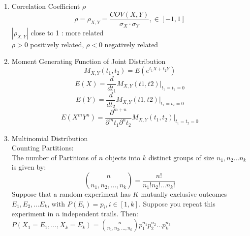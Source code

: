 \documentclass[10pt]{article}
\begin{document}
\begin{multicols}{2}
\begin{enumerate}
\begin{enumerate}
				\item Correlation Coefficient $\rho$\\
				$$\rho = \rho_{X,Y}= \frac{COV(X,Y)}{\sigma_X \cdot \sigma_Y}, \in [-1,1]$$
				$|\rho_{X,Y}|$ close to 1 : more related\\
				$\rho > 0$ positively related, $\rho < 0$ negatively related
				\item Moment Generating Function of Joint Distribution
				$$M_{X,Y}(t_1, t_2) = E(e^{t_1X + t_2Y})$$
				$$E(X)=\frac{d}{dt_1}M_{X,Y}(t1,t2)|_{t_1=t_2=0}$$
				$$E(Y) = \frac{d}{dt_2}M_{X,Y}(t1,t2)|_{t_1=t_2=0}$$
				$$E(X^mY^n) = \frac{\partial^{m+n}}{\partial^mt_1\partial^nt_2}M_{X,Y}(t_1, t_2)|_{t_1=t_2=0}$$
				\item Multinomial Distribution\\
				Counting Partitions:\\
				The number of Partitions of $n$ objects into $k$ distinct groups of size $n_1, n_2 \dots n_k$ is given by:
				$${n \choose {n_1, n_2, \dots , n_k}} =  \frac{n!}{n_1!n_2! \dots n_k!}$$
				Suppose that a random experiment has $K$ mutually exclusive outcomes $E_1, E_2, \dots E_k$, with $P(E_i) = p_i , i \in [1,k]$. Suppose you repeat this experiment in $n$ independent trails. Then:\\
				$P(X_1 = E_1, \dots , X_k = E_k) = {n \choose {n_1, n_2, \dots , n_k}}p_1^{n_1}p_2^{n_2} \dots p_k^{n_k}$
			\end{enumerate}
		\end{enumerate}
	\newpage
	\end{multicols}
\end{document}
